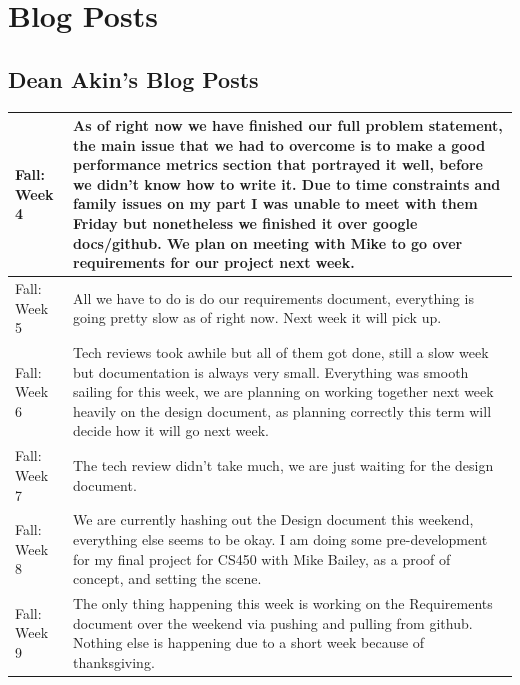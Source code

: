 \documentclass[onecolumn, draftclsnofoot,10pt, compsoc]{IEEEtran}
\begin{document}
\section{Blog Posts}
\subsection* {Dean Akin's Blog Posts}
\begin{longtable} {|p{1.5cm}|p{13.5cm}|} \hline
Fall: Week 4 &
As of right now we have finished our full problem statement, the main issue that we had to overcome is to make a good performance metrics section that portrayed it well, before we didn’t know how to write it. Due to time constraints and family issues on my part I was unable to meet with them Friday but nonetheless we finished it over google docs/github. We plan on meeting with Mike to go over requirements for our project next week. \\ \hline

Fall: Week 5 &
All we have to do is do our requirements document, everything is going pretty slow as of right now. Next week it will pick up. \\ \hline

Fall: Week 6 &
Tech reviews took awhile but all of them got done, still a slow week but documentation is always very small. Everything was smooth sailing for this week, we are planning on working together next week heavily on the design document, as planning correctly this term will decide how it will go next week.  \\ \hline

Fall: Week 7 &
The tech review didn’t take much, we are just waiting for the design document. \\ \hline

Fall: Week 8 &
We are currently hashing out the Design document this weekend, everything else seems to be okay. I am doing some pre-development for my final project for CS450 with Mike Bailey, as a proof of concept, and setting the scene. \\ \hline

Fall: Week 9 &
The only thing happening this week is working on the Requirements document over the weekend via pushing and pulling from github. Nothing else is happening due to a short week because of thanksgiving.  \\ \hline


\end{longtable}
\end{document}
